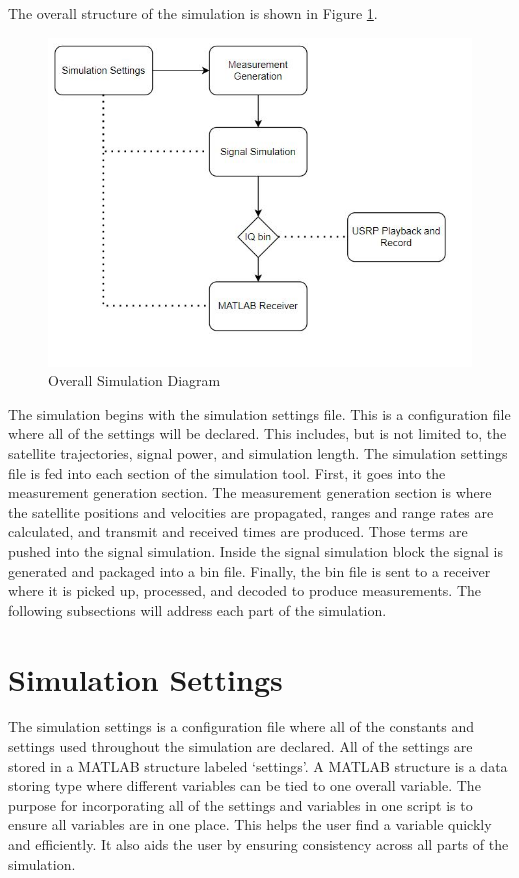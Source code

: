\documentclass[12pt]{report}
\begin{document}
The overall structure of the simulation is shown in Figure \ref{fig:SimDiagram}.

\begin{figure}[ht]
    \centering
    \includegraphics[width=5.0in]{OverallSimulationDiagram}
    \caption{Overall Simulation Diagram}
    \label{fig:SimDiagram}
\end{figure}

The simulation begins with the simulation settings file. This is a configuration file where all of the settings will be declared. This includes, but is not limited to, the satellite trajectories, signal power, and simulation length. The simulation settings file is fed into each section of the simulation tool. First, it goes into the measurement generation section. The measurement generation section is where the satellite positions and velocities are propagated, ranges and range rates are calculated, and transmit and received times are produced. Those terms are pushed into the signal simulation. Inside the signal simulation block the signal is generated and packaged into a bin file. Finally, the bin file is sent to a receiver where it is picked up, processed, and decoded to produce measurements. The following subsections will address each part of the simulation.

\section{Simulation Settings}

The simulation settings is a configuration file where all of the constants and settings used throughout the simulation are declared. All of the settings are stored in a MATLAB structure labeled `settings'. A MATLAB structure is a data storing type where different variables can be tied to one overall variable. The purpose for incorporating all of the settings and variables in one script is to ensure all variables are in one place. This helps the user find a variable quickly and efficiently. It also aids the user by ensuring consistency across all parts of the simulation. 
\end{document}
